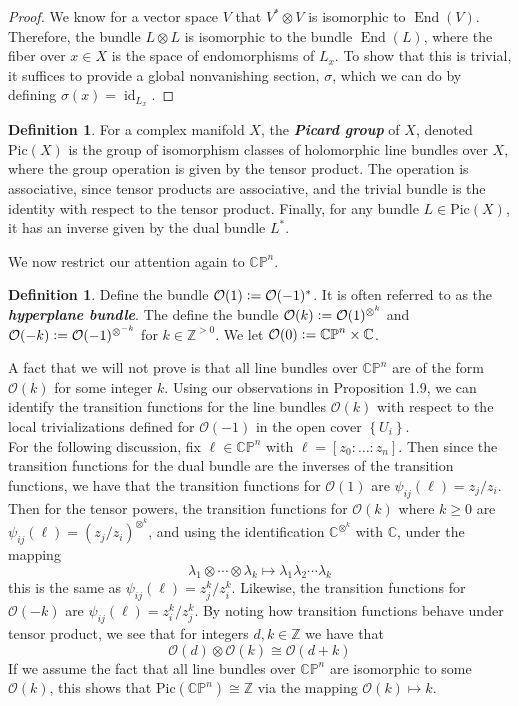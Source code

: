 \documentclass[psamsfonts, 12pt]{amsart}
\theoremstyle{definition}
\newtheorem{defn}[thm]{Definition}
\theoremstyle{remark}
\renewcommand{\O}{\mathcal{O}}
\newcommand{\ib}[1]{\textbf{\textit{#1}}}
\newcommand{\Z}{\mathbb{Z}}
\newcommand{\C}{\mathbb{C}}
\newcommand{\CP}{\mathbb{CP}}
\newcommand{\set}[1]{\left\lbrace #1 \right\rbrace}
\newcommand{\defeq}{\vcentcolon=}
\DeclareMathOperator{\id}{id}
\DeclareMathOperator{\End}{End}
\begin{document}
%
\begin{proof}
We know for a vector space $V$ that $V^*\otimes V$ is isomorphic to $\End(V)$.
Therefore, the bundle $L \otimes L$ is isomorphic to the bundle
$\End(L)$, where the fiber over $x \in X$ is the space of endomorphisms of $L_x$.
To show that this is trivial, it suffices to provide a global nonvanishing section,
$\sigma$, which we can do by defining $\sigma(x) = \id_{L_x}$.
\end{proof}
%
\begin{defn}
For a complex manifold $X$, the \ib{Picard group} of $X$, denoted
$\mathrm{Pic}(X)$ is the group of isomorphism classes of holomorphic line bundles over
$X$, where the group operation is given by the tensor product. The operation is
associative, since tensor products are associative, and the trivial bundle is the
identity with respect to the tensor product. Finally, for any bundle
$L \in \mathrm{Pic}(X)$, it has an inverse given by the dual bundle $L^*$.
\end{defn}
%
We now restrict our attention again to $\CP^n$.
%
\begin{defn}
Define the bundle $\O(1) \defeq \O(-1)^*$. It is often referred to as the
\ib{hyperplane bundle}. The define the bundle $\O(k) \defeq \O(1)^{\otimes^k}$
and $\O(-k) \defeq \O(-1)^{\otimes^{-k}}$ for $k \in \Z^{>0}$. We let
$\O(0)\defeq \CP^n \times \C$.
\end{defn}
%
A fact that we will not prove is that all line bundles over $\CP^n$ are of
the form $\O(k)$ for some integer $k$. Using our observations in Proposition 1.9,
we can identify the transition functions for the line bundles $\O(k)$ with
respect to the local trivializations defined for $\O(-1)$ in the open cover
$\set{U_i}$. \\

For the following discussion, fix $\ell \in \CP^n$ with $\ell = [z_0: \ldots : z_n]$.
Then since the transition functions for the dual bundle are the inverses of the
transition functions, we have that the transition functions for $\O(1)$ are
$\psi_{ij}(\ell) = z_j/z_i$. Then for the tensor powers, the transition functions
for $\O(k)$ where $k \geq 0$ are $\psi_{ij}(\ell) = (z_j/z_i)^{\otimes^k}$, and
using the identification $\C^{\otimes^k}$ with $\C$, under the mapping
\[
\lambda_1 \otimes \cdots \otimes \lambda_k \mapsto \lambda_1\lambda_2\cdots\lambda_k
\]
this is the same as
$\psi_{ij}(\ell) = z_j^k/z_i^k$. Likewise, the transition functions for $\O(-k)$
are $\psi_{ij}(\ell) = z_i^k/z_j^k$. By noting how transition functions behave
under tensor product, we see that for integers $d,k \in \Z$ we have that
\[
\O(d) \otimes \O(k) \cong \O(d+k)
\]
If we assume the fact that all line bundles over $\CP^n$ are isomorphic to some
$\O(k)$, this shows that $\mathrm{Pic}(\CP^n) \cong \Z$ via the mapping
$\O(k)\mapsto k$. \\
\end{document}

